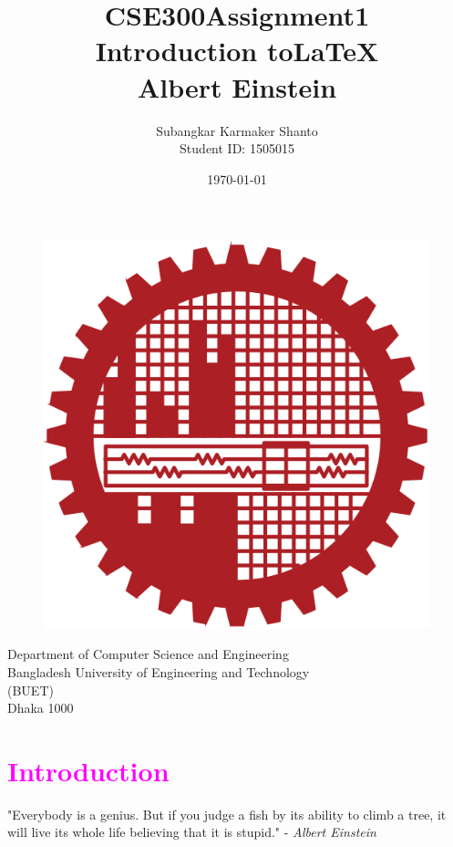 \documentclass{article}
\title {CSE300\textunderscore Assignment1\\Introduction to\LaTeX\\Albert Einstein}
\author{Subangkar Karmaker Shanto\\Student ID: 1505015}
\date{}
\begin{document}
\begin{titlepage}
\maketitle
\thispagestyle{empty}
\null
\vfill
\begin{figure}[h]
    \centering
    \includegraphics[width=.21\textwidth]{figures/logoBIRN.png}
    \label{fig:logo}
\end{figure}
\begin{center}
Department of Computer Science and Engineering \\Bangladesh University of Engineering and Technology\\(BUET)\\Dhaka 1000 \\
\date{\today}
    
\end{center}
\end{titlepage}

\newpage

\tableofcontents

\newpage


\section{\textcolor{magenta}{Introduction}}

\begin{displayquote}
"Everybody is a genius. But if you judge a fish by its ability to climb a tree, it will live its whole life believing that it is stupid." - {\textit{Albert Einstein}}
\end{displayquote}
\end{document}
